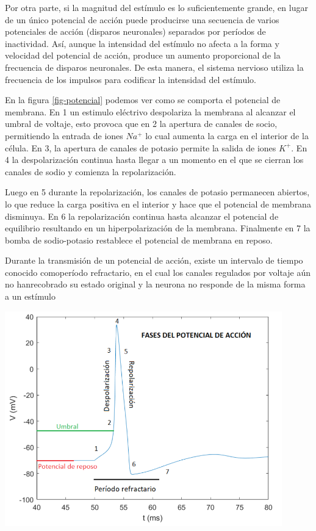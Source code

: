 \documentclass[aps,prl,reprint,groupedaddress]{revtex4-2}
\newenvironment{Figura}
  {\par\medskip\noindent\minipage{\linewidth}}
  {\endminipage\par\medskip}
\begin{document}
Por otra parte, si la magnitud del estímulo es lo suﬁcientemente grande, en 
lugar de un único potencial de acción puede producirse una secuencia de varios 
potenciales de acción (disparos neuronales) separados por períodos de inactividad. 
Así, aunque la intensidad del estímulo no afecta a la forma y velocidad del 
potencial de acción, produce un aumento proporcional de la frecuencia de 
disparos neuronales. De esta manera, el sistema nervioso utiliza la frecuencia 
de los impulsos para codiﬁcar la intensidad del estímulo.

En la figura \ref{fig-potencial} podemos ver como se comporta el potencial de 
membrana. En 1 un estimulo eléctrivo despolariza la membrana al alcanzar el 
umbral de voltaje, esto provoca que en 2 la apertura de canales de socio, 
permitiendo la entrada de iones $Na^{+}$ lo cual aumenta la carga en el 
interior de la célula. En 3, la apertura de canales de potasio permite 
la salida de iones $K^{+}$. En 4 la despolarización continua hasta llegar a un 
momento en el que se cierran los canales de sodio y comienza la repolarización.

Luego en 5 durante la repolarización, los canales de potasio permanecen abiertos, 
lo que reduce la carga positiva en el interior y hace que el potencial de 
membrana disminuya. En 6 la repolarización continua hasta alcanzar el potencial 
de equilibrio resultando en un hiperpolarización de la membrana. Finalmente en 7
la bomba de sodio-potasio restablece el potencial de membrana en reposo.

Durante la transmisión de un potencial de acción, existe un intervalo de tiempo 
conocido comoperíodo refractario, en el cual los canales regulados por voltaje 
aún no hanrecobrado su estado original y la neurona no responde de la misma 
forma a un estímulo
\begin{Figura}
    \centering
    \includegraphics[width=0.9\textwidth]{figs/fases_potencial.png}
    \label{fig-potencial}
\end{Figura}
\end{document}

